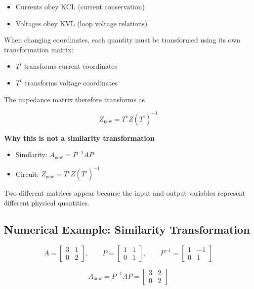 \begin{itemize}
\item Currents obey KCL (current conservation)
\item Voltages obey KVL (loop voltage relations)
\end{itemize}

When changing coordinates, each quantity must be transformed using its
own transformation matrix:

\begin{itemize}
\item $T^i$ transforms current coordinates
\item $T^v$ transforms voltage coordinates
\end{itemize}

The impedance matrix therefore transforms as

\[
Z_{\text{new}} = T^v Z (T^i)^{-1}
\]

\textbf{Why this is not a similarity transformation}

\begin{itemize}
\item Similarity: $A_{\text{new}} = P^{-1}AP$
\item Circuit: $Z_{\text{new}} = T^v Z (T^i)^{-1}$
\end{itemize}

Two different matrices appear because the input and output variables
represent different physical quantities.

\subsection{Numerical Example: Similarity Transformation}
\label{sec:numerical-similarity}

\[
A =
\begin{bmatrix}
3 & 1\\
0 & 2
\end{bmatrix},
\qquad
P =
\begin{bmatrix}
1 & 1\\
0 & 1
\end{bmatrix},
\qquad
P^{-1} =
\begin{bmatrix}
1 & -1\\
0 & 1
\end{bmatrix}
\]

\[
A_{\text{new}}
=
P^{-1}AP
=
\begin{bmatrix}
3 & 2\\
0 & 2
\end{bmatrix}
\]

